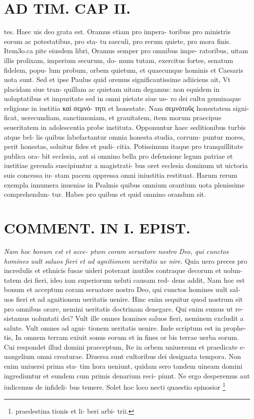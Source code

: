 \documentclass{article}
\begin{document}
\begin{pages}
\section*{AD TIM. CAP II. }
\marginpar{[ p.112 ]}\pstart tes. Haec uis deo grata est. Oramus etiam pro impera- toribus pro ministris eorum ac potestatibus, pro sta- tu saeculi, pro rerum quiete, pro mora finis. Item3o.ca pite eiusdem libri, Oramus semper pro omnibus impe- ratoribus, uitam illis prolixam, imperium securum, do- mum tutam, exercitus fortes, senatum fidelem, popu- lum probum, orbem quietum, et quaecunque hominis et Caesaris uota sunt. Sed et ipse Paulus quid oremus significautissime adiiciens ait, Vt placidam siue tran- quillam ac quietam uitam degamus: non equidem in uoluptatibus et impuritate sed in omni pietate siue ue- ro dei cultu genuinaque religione in iustitia καί σεμνό- τητι et honestate. Nam σεμνότοῦς honestatem signi- ficat, uerecundiam, sanctimoniam, et grauitatem, item morum praecipue seueritatem in adolescentia probe instituta. Opponuntur haec seditionibus turbis atque bel- lis quibus labefactantur omnia honesta studia, corrum- puntur mores, perit honestas, soluitur fides et pudi- citia. Potissimum itaque pro tranquillitate publica ora- bit ecclesia, aut si omnino bella pro defensione legum patriae et iustitiae gerenda suscipiuntur a magistrati- bus oret ecclesia dominum ut uictoria suis concessa iu- stam pacem oppressa omni iniustitia restituat. Harum rerum exempla innumera inuenias in Psalmis quibus omnium orantium uota plenissime comprehendun- tur. Habes pro quibus et quid omnino orandum sit.  \pend
\section*{COMMENT. IN I. EPIST. }
\textit{Nam hoc bonum est et acce- ptum coram seruatore nostro Deo, qui cunctos homines uult saluos fieri et ad agnitionem ueritatis ue nire. }\pstart Quia uero preces pro incredulis et ethnicis fusae uideri poterant inutiles contraque decorum et uolun- tatem dei fieri, ideo iam superiorum ueluti causam red- dens addit, Nam hoc est bonum et acceptum coram seruatore nostro Deo, qui cunctos homines uult sal- uos fieri et ad agnitionem ueritatis uenire. Hinc enim sequitur quod nostrum sit pro omnibus orare, nemini ueritatis doctrinam denegare. Qui enim sumus ut re- sistamus uoluntati dei? Vult ille omnes homines saluos fieri, neminem excludit a salute. Vult omnes ad agni- tionem ueritatis uenire. Inde scriptum est in prophe- tis, In omnem terram exiuit sonus eorum et in fines or bis terrae uerba eorum. Cui respondet illud domini praeceptum, Ite in orbem uniuersum et praedicate e- uangelium omni creaturae. Diuersa sunt cultoribus dei designata tempora. Non enim uniuersi prima sta- tim hora ueniunt, quidam sero tandem uineam domini ingrediuntur et eundem cum primis denarium reci- piunt. Ne ergo desperemus aut iudicemus de infideli- bus temere. Solet hoc loco necti quaestio spinosior  \pend\footnote{\footnotesizeQuaestio praedestina tionis et li- beri arbi- trii. }

\end{pages}
\end{document}
